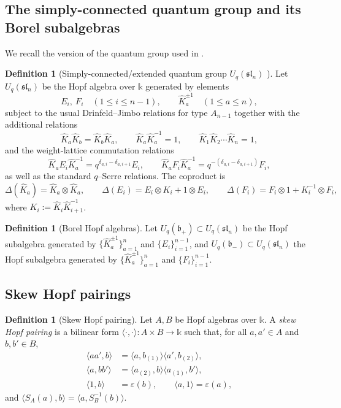 \documentclass[11pt]{article}
\newcommand{\Bbbk}{\mathbb{k}}
\newcommand{\Uc}{U}
\newcommand{\sl}{\mathfrak{sl}}
\newcommand{\fb}{\mathfrak{b}}
\newcommand{\la}{\langle}
\newcommand{\ra}{\rangle}
\theoremstyle{plain}
\theoremstyle{definition}
\newtheorem{definition}[theorem]{Definition}
\begin{document}
\subsection{The simply-connected quantum group and its Borel subalgebras}

We recall the version of the quantum group used in \cite{KS}.

\begin{definition}[Simply-connected/extended quantum group $\Uc_q(\sl_n)$ {\cite[Ch.~8]{KS}}]\label{def:Uext}
Let $\Uc_q(\sl_n)$ be the Hopf algebra over $\Bbbk$ generated by elements
\[
E_i,\ F_i\quad (1\le i\le n-1),\qquad
\hat K_a^{\pm 1}\quad (1\le a\le n),
\]
subject to the usual Drinfeld--Jimbo relations for type $A_{n-1}$ together with the additional relations
\[
\hat K_a\hat K_b=\hat K_b\hat K_a,\qquad \hat K_a\hat K_a^{-1}=1,\qquad \hat K_1\hat K_2\cdots \hat K_n=1,
\]
and the weight-lattice commutation relations
\[
\hat K_a E_i \hat K_a^{-1}=q^{\delta_{a,i}-\delta_{a,i+1}}E_i,\qquad
\hat K_a F_i \hat K_a^{-1}=q^{-(\delta_{a,i}-\delta_{a,i+1})}F_i,
\]
as well as the standard $q$--Serre relations. The coproduct is
\[
\Delta(\hat K_a)=\hat K_a\otimes \hat K_a,\qquad
\Delta(E_i)=E_i\otimes K_i +1\otimes E_i,\qquad
\Delta(F_i)=F_i\otimes 1 +K_i^{-1}\otimes F_i,
\]
where $K_i:=\hat K_i\hat K_{i+1}^{-1}$.
\end{definition}

\begin{definition}[Borel Hopf algebras]
Let $\Uc_q(\fb_+)\subset \Uc_q(\sl_n)$ be the Hopf subalgebra generated by $\{\hat K_a^{\pm1}\}_{a=1}^n$ and $\{E_i\}_{i=1}^{n-1}$, and
$\Uc_q(\fb_-)\subset \Uc_q(\sl_n)$ the Hopf subalgebra generated by $\{\hat K_a^{\pm1}\}_{a=1}^n$ and $\{F_i\}_{i=1}^{n-1}$.
\end{definition}

\subsection{Skew Hopf pairings}

\begin{definition}[Skew Hopf pairing]\label{def:skew-pairing}
Let $A,B$ be Hopf algebras over $\Bbbk$. A \emph{skew Hopf pairing} is a bilinear form
$\la\cdot,\cdot\ra:A\times B\to \Bbbk$
such that, for all $a,a'\in A$ and $b,b'\in B$,
\begin{align*}
\la aa',b\ra &= \la a,b_{(1)}\ra \la a',b_{(2)}\ra,\\
\la a,bb'\ra &= \la a_{(2)},b\ra \la a_{(1)},b'\ra,\\
\la 1,b\ra &=\varepsilon(b),\qquad \la a,1\ra=\varepsilon(a),
\end{align*}
and $\la S_A(a),b\ra=\la a,S_B^{-1}(b)\ra$.
\end{definition}
\end{document}
